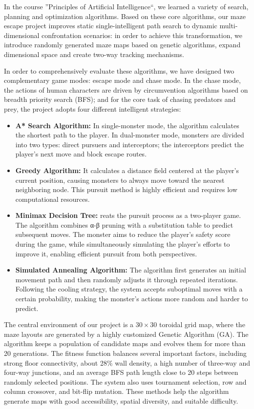 \documentclass[12pt,a4paper]{article}
\begin{document}
In the course ”Principles of Artificial Intelligence“, we learned a variety of search, planning and optimization algorithms. Based on these core algorithms, our maze escape project improves static single-intelligent path search to dynamic multi-dimensional confrontation scenarios: in order to achieve this transformation, we introduce randomly generated maze maps based on genetic algorithms, expand dimensional space and create two-way tracking mechanisms.

In order to comprehensively evaluate these algorithms, we have designed two complementary game modes: escape mode and chase mode. In the chase mode, the actions of human characters are driven by circumvention algorithms based on breadth priority search (BFS); and for the core task of chasing predators and prey, the project adopts four different intelligent strategies:

\begin{itemize}
    \item \textbf{A* Search Algorithm:} In single-monster mode, the algorithm calculates the shortest path to the player. In dual-monster mode, monsters are divided into two types: direct pursuers and interceptors; the interceptors predict the player's next move and block escape routes.
    
    \item \textbf{Greedy Algorithm:} It calculates a distance field centered at the player's current position, causing monsters to always move toward the nearest neighboring node. This pursuit method is highly efficient and requires low computational resources.
    
    \item \textbf{Minimax Decision Tree:} reats the pursuit process as a two-player game. The algorithm combines α-β pruning with a substitution table to predict subsequent moves. The monster aims to reduce the player's safety score during the game, while simultaneously simulating the player's efforts to improve it, enabling efficient pursuit from both perspectives.
    
    \item \textbf{Simulated Annealing Algorithm:} The algorithm first generates an initial movement path and then randomly adjusts it through repeated iterations. Following the cooling strategy, the system accepts suboptimal moves with a certain probability, making the monster's actions more random and harder to predict.
    
\end{itemize}
The central environment of our project is a $30 \times 30$ toroidal grid map, where the maze layouts are generated by a highly customized Genetic Algorithm (GA). The algorithm keeps a population of candidate maps and evolves them for more than 20 generations. The fitness function balances several important factors, including strong floor connectivity, about 28\% wall density, a high number of three-way and four-way junctions, and an average BFS path length close to 20 steps between randomly selected positions. The system also uses tournament selection, row and column crossover, and bit-flip mutation. These methods help the algorithm generate maps with good accessibility, spatial diversity, and suitable difficulty.
\end{document}

